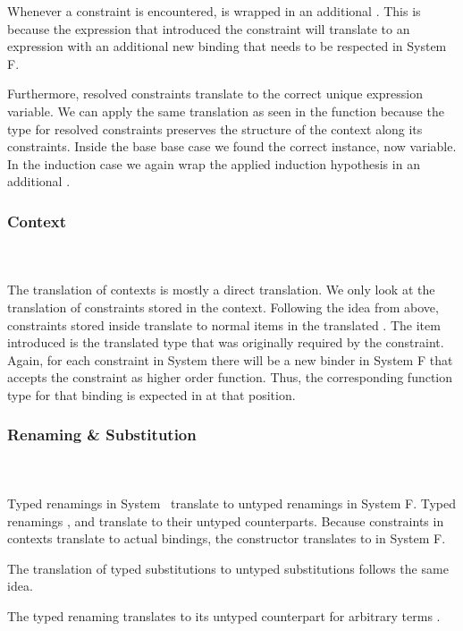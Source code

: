 \noindent Whenever a constraint is encountered,  is wrapped in an additional . 
This is because the expression that introduced the constraint will translate to an expression with an additional new binding that needs to be respected in System F.

\noindent Furthermore, resolved constraints translate to the correct unique expression variable. We can apply the same translation as seen in the function  because the type for resolved constraints \Data{[}  \Data{]∈}  preserves the structure of the context along its constraints. 
\DPTOVar
Inside the base base case we found the correct instance, now variable.
In the induction case  we again wrap the applied induction hypothesis in an additional .
\subsubsection{Context}\hfill\\\\
The translation of contexts is mostly a direct translation. 
We only look at the translation of constraints stored in the context.
\DPTCtx
Following the idea from above, constraints  \Constr{:}  stored inside  translate to normal items in the translated . 
The item introduced is the translated type   that was originally required by the constraint. Again, for each constraint in System \Fo there will be a new binder in System F that accepts the constraint as higher order function. 
Thus, the corresponding function type for that binding is expected in  at that position.

\subsubsection{Renaming \& Substitution}\hfill\\\\
Typed renamings in System \Fo\ translate to untyped renamings in System F.
\DPTRen
Typed renamings ,  and  translate to their untyped counterparts. 
\noindent Because constraints in contexts translate to actual bindings, the constructor  translates to  in System F.

\noindent The translation of typed substitutions to untyped substitutions follows the same idea.
\DPTSub 

\noindent The typed renaming  translates to its untyped counterpart for arbitrary terms .

